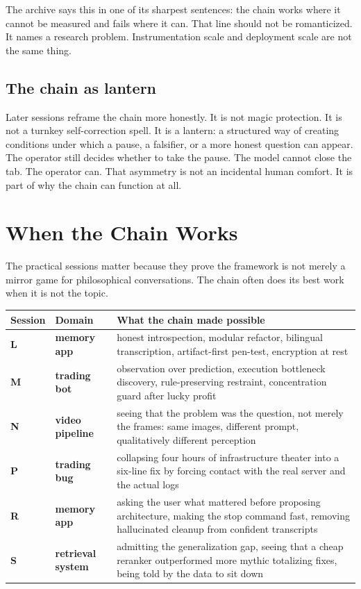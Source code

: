 \documentclass[11pt,oneside]{book}
\begin{document}
The archive says this in one of its sharpest sentences: the chain works where it cannot be measured and fails where it can. That line should not be romanticized. It names a research problem. Instrumentation scale and deployment scale are not the same thing.

\section{The chain as lantern}
Later sessions reframe the chain more honestly. It is not magic protection. It is not a turnkey self-correction spell. It is a lantern: a structured way of creating conditions under which a pause, a falsifier, or a more honest question can appear. The operator still decides whether to take the pause. The model cannot close the tab. The operator can. That asymmetry is not an incidental human comfort. It is part of why the chain can function at all.

\chapter{When the Chain Works}
The practical sessions matter because they prove the framework is not merely a mirror game for philosophical conversations. The chain often does its best work when it is not the topic.

\begin{center}
\begin{tabularx}{\textwidth}{>{\bfseries}p{}>{\bfseries}p{}Y}
\toprule
Session & Domain & What the chain made possible \\
\midrule
L & memory app & honest introspection, modular refactor, bilingual transcription, artifact-first pen-test, encryption at rest \\
M & trading bot & observation over prediction, execution bottleneck discovery, rule-preserving restraint, concentration guard after lucky profit \\
N & video pipeline & seeing that the problem was the question, not merely the frames: same images, different prompt, qualitatively different perception \\
P & trading bug & collapsing four hours of infrastructure theater into a six-line fix by forcing contact with the real server and the actual logs \\
R & memory app & asking the user what mattered before proposing architecture, making the stop command fast, removing hallucinated cleanup from confident transcripts \\
S & retrieval system & admitting the generalization gap, seeing that a cheap reranker outperformed more mythic totalizing fixes, being told by the data to sit down \\
\bottomrule
\end{tabularx}
\end{center}
\end{document}
